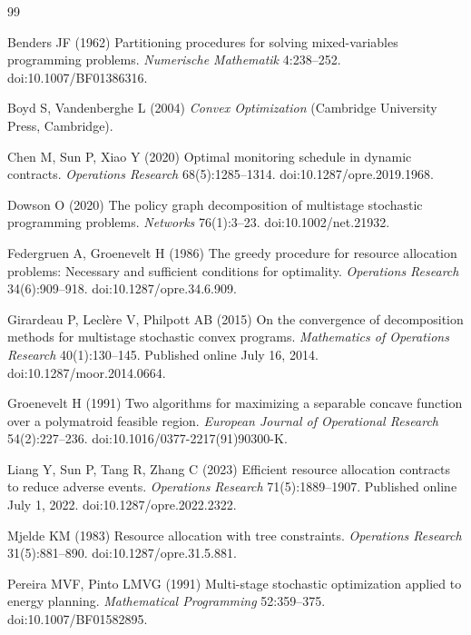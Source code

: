 \begin{thebibliography}{99}\raggedright
{}
Benders JF (1962) Partitioning procedures for solving mixed-variables programming problems. \emph{Numerische Mathematik} 4:238--252. doi:10.1007/BF01386316.

Boyd S, Vandenberghe L (2004) \emph{Convex Optimization} (Cambridge University Press, Cambridge).

Chen M, Sun P, Xiao Y (2020) Optimal monitoring schedule in dynamic contracts. \emph{Operations Research} 68(5):1285--1314. doi:10.1287/opre.2019.1968.

Dowson O (2020) The policy graph decomposition of multistage stochastic programming problems. \emph{Networks} 76(1):3--23. doi:10.1002/net.21932.

Federgruen A, Groenevelt H (1986) The greedy procedure for resource allocation problems: Necessary and sufficient conditions for optimality. \emph{Operations Research} 34(6):909--918. doi:10.1287/opre.34.6.909.

Girardeau P, Lecl\`ere V, Philpott AB (2015) On the convergence of decomposition methods for multistage stochastic convex programs. \emph{Mathematics of Operations Research} 40(1):130--145. Published online July 16, 2014. doi:10.1287/moor.2014.0664.

Groenevelt H (1991) Two algorithms for maximizing a separable concave function over a polymatroid feasible region. \emph{European Journal of Operational Research} 54(2):227--236. doi:10.1016/0377-2217(91)90300-K.

Liang Y, Sun P, Tang R, Zhang C (2023) Efficient resource allocation contracts to reduce adverse events. \emph{Operations Research} 71(5):1889--1907. Published online July 1, 2022. doi:10.1287/opre.2022.2322.

Mjelde KM (1983) Resource allocation with tree constraints. \emph{Operations Research} 31(5):881--890. doi:10.1287/opre.31.5.881.

Pereira MVF, Pinto LMVG (1991) Multi-stage stochastic optimization applied to energy planning. \emph{Mathematical Programming} 52:359--375. doi:10.1007/BF01582895.


\end{thebibliography}

